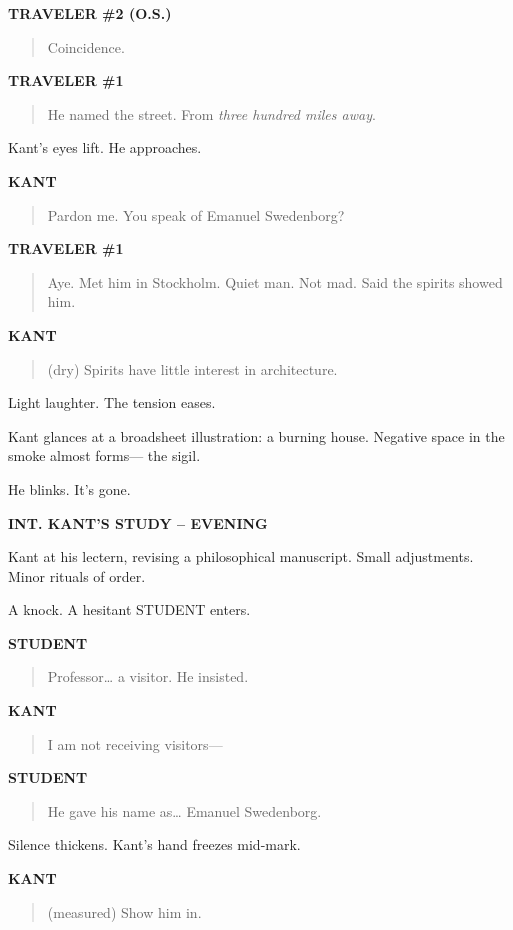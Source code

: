 \documentclass[12pt]{article}
\newcommand{\Scene}[1]{\vspace{1.2em}\textbf{#1}\vspace{0.8em}}
\newcommand{\Character}[1]{\vspace{0.8em}\textbf{#1}\vspace{0.4em}}
\newenvironment{Dialogue}{\begin{quote}\begin{RaggedRight}}{\end{RaggedRight}\end{quote}}
\newcommand{\Action}[1]{\vspace{0.4em}#1\vspace{0.4em}}
\begin{document}
\Character{TRAVELER \#2 (O.S.)}
\begin{Dialogue}
Coincidence.
\end{Dialogue}

\Character{TRAVELER \#1}
\begin{Dialogue}
He named the street. From \textit{three hundred miles away}.
\end{Dialogue}

\Action{Kant's eyes lift. He approaches.}

\Character{KANT}
\begin{Dialogue}
Pardon me. You speak of Emanuel Swedenborg?
\end{Dialogue}

\Character{TRAVELER \#1}
\begin{Dialogue}
Aye. Met him in Stockholm. Quiet man. Not mad.  
Said the spirits showed him.
\end{Dialogue}

\Character{KANT}
\begin{Dialogue}
(dry)  
Spirits have little interest in architecture.
\end{Dialogue}

\Action{Light laughter. The tension eases.}

\Action{Kant glances at a broadsheet illustration: a burning house.  
Negative space in the smoke almost forms—  
the sigil.}

\Action{He blinks. It’s gone.}

\Scene{INT. KANT’S STUDY – EVENING}

\Action{Kant at his lectern, revising a philosophical manuscript.  
Small adjustments. Minor rituals of order.}

\Action{A knock. A hesitant STUDENT enters.}

\Character{STUDENT}
\begin{Dialogue}
Professor… a visitor. He insisted.
\end{Dialogue}

\Character{KANT}
\begin{Dialogue}
I am not receiving visitors—
\end{Dialogue}

\Character{STUDENT}
\begin{Dialogue}
He gave his name as… Emanuel Swedenborg.
\end{Dialogue}

\Action{Silence thickens. Kant's hand freezes mid-mark.}

\Character{KANT}
\begin{Dialogue}
(measured)  
Show him in.
\end{Dialogue}
\end{document}
